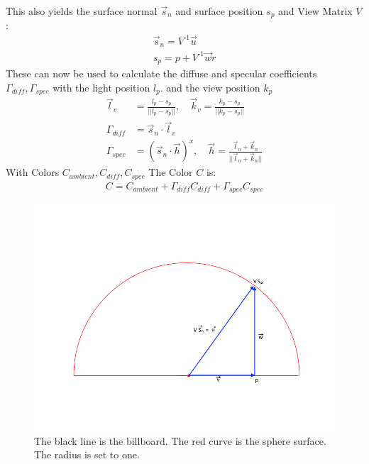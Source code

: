 \documentclass{ACGSeminar}
\begin{document}
This also yields the surface normal \(\vec{s}_n\) and surface position \(s_p\) and View Matrix \(V\):
\begin{equation}
\begin{aligned}
\vec{s}_n = V^{\text{-}1} \vec{u} \\
s_p = p + V^{\text{-}1} \vec{w} r
\end{aligned}
\end{equation}
These can now be used to calculate the diffuse and specular coefficients \(\Gamma_{diff}, \Gamma_{spec}\) with the light position \(l_{p}\). and the view position \(k_{p}\)
\begin{equation} 
\begin{aligned}
\vec{l}_v &= \frac{l_p - s_p}{||l_p - s_p||}, \quad \vec{k}_v  = \frac{k_p - s_p}{||k_p - s_p||} \\
\Gamma_{diff} &= \vec{s}_n \cdot \vec{l}_v \\
\Gamma_{spec} &= ( \vec{s}_n \cdot \vec{h}) ^ x, \quad \vec{h} = \frac{\vec{l}_n + \vec{k}_n}{||\vec{l}_n + \vec{k}_n||}
\end{aligned}
\end{equation}
With Colors \(C_{ambient}, C_{diff}, C_{spec}\) The Color \(C\) is:
\begin{equation}
\begin{aligned}
C = C_{ambient} + \Gamma_{diff} C_{diff} + \Gamma_{spec} C_{spec}
\end{aligned}
\end{equation}
\begin{figure}[b!]
  \begin{centering}
    \includegraphics[width=15cm]{figures/particle_shader.png}\par
  \end{centering}
  \caption{The black line is the billboard. The red curve is the sphere surface. The radius is set to one.}
  \label{fig:particle_shader}
\end{figure}
\end{document}
